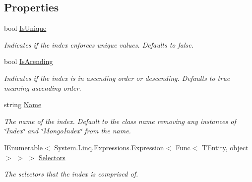 \subsection*{Properties}
\begin{DoxyCompactItemize}
\item 
bool \hyperlink{classCqrs_1_1Mongo_1_1DataStores_1_1Indexes_1_1MongoIndex_a22720bf0b6c1ea7b910dd7e0bf0475d3_a22720bf0b6c1ea7b910dd7e0bf0475d3}{Is\+Unique}
\begin{DoxyCompactList}\small\item\em Indicates if the index enforces unique values. Defaults to false. \end{DoxyCompactList}\item 
bool \hyperlink{classCqrs_1_1Mongo_1_1DataStores_1_1Indexes_1_1MongoIndex_a59cbfafa9c0a32a8f9befddc3fb3956b_a59cbfafa9c0a32a8f9befddc3fb3956b}{Is\+Acending}
\begin{DoxyCompactList}\small\item\em Indicates if the index is in ascending order or descending. Defaults to true meaning ascending order. \end{DoxyCompactList}\item 
string \hyperlink{classCqrs_1_1Mongo_1_1DataStores_1_1Indexes_1_1MongoIndex_a635b552b98a7638ca3a474e54652fde6_a635b552b98a7638ca3a474e54652fde6}{Name}
\begin{DoxyCompactList}\small\item\em The name of the index. Default to the class name removing any instances of \char`\"{}\+Index\char`\"{} and \char`\"{}\+Mongo\+Index\char`\"{} from the name. \end{DoxyCompactList}\item 
I\+Enumerable$<$ System.\+Linq.\+Expressions.\+Expression$<$ Func$<$ T\+Entity, object $>$ $>$ $>$ \hyperlink{classCqrs_1_1Mongo_1_1DataStores_1_1Indexes_1_1MongoIndex_a43e73501f54becfaee4430a89841055a_a43e73501f54becfaee4430a89841055a}{Selectors}
\begin{DoxyCompactList}\small\item\em The selectors that the index is comprised of. \end{DoxyCompactList}\end{DoxyCompactItemize}


